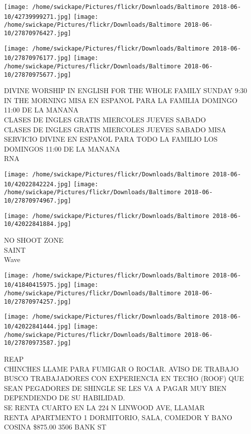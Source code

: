 \documentclass[10pt,letterpaper]{article}
\begin{document}
\texttt{[image: /home/swickape/Pictures/flickr/Downloads/Baltimore 2018-06-10/42739999271.jpg]}
\texttt{[image: /home/swickape/Pictures/flickr/Downloads/Baltimore 2018-06-10/27870976427.jpg]}

\texttt{[image: /home/swickape/Pictures/flickr/Downloads/Baltimore 2018-06-10/27870976177.jpg]}
\texttt{[image: /home/swickape/Pictures/flickr/Downloads/Baltimore 2018-06-10/27870975677.jpg]}

DIVINE WORSHIP IN ENGLISH FOR THE WHOLE FAMILY SUNDAY 9:30 IN THE MORNING MISA EN ESPANOL PARA LA FAMILIA DOMINGO 11:00 DE LA MANANA\\
CLASES DE INGLES GRATIS MIERCOLES JUEVES SABADO\\
CLASES DE INGLES GRATIS MIERCOLES JUEVES SABADO MISA SERVICIO DIVINE EN ESPANOL PARA TODO LA FAMILIO LOS DOMINGOS 11:00 DE LA MANANA\\
RNA\\
\pagebreak

\texttt{[image: /home/swickape/Pictures/flickr/Downloads/Baltimore 2018-06-10/42022842224.jpg]}
\texttt{[image: /home/swickape/Pictures/flickr/Downloads/Baltimore 2018-06-10/27870974967.jpg]}

\vspace{0.25in}
\texttt{[image: /home/swickape/Pictures/flickr/Downloads/Baltimore 2018-06-10/42022841884.jpg]}

NO SHOOT ZONE\\
SAINT\\
Wave\\
\pagebreak

\texttt{[image: /home/swickape/Pictures/flickr/Downloads/Baltimore 2018-06-10/41840415975.jpg]}
\texttt{[image: /home/swickape/Pictures/flickr/Downloads/Baltimore 2018-06-10/27870974257.jpg]}

\texttt{[image: /home/swickape/Pictures/flickr/Downloads/Baltimore 2018-06-10/42022841444.jpg]}
\texttt{[image: /home/swickape/Pictures/flickr/Downloads/Baltimore 2018-06-10/27870973587.jpg]}

REAP\\
CHINCHES LLAME PARA FUMIGAR O ROCIAR. AVISO DE TRABAJO BUSCO TRABAJADORES CON EXPERIENCIA EN TECHO (ROOF) QUE SEAN PEGADORES DE SHINGLE SE LES VA A PAGAR MUY BIEN DEPENDIENDO DE SU HABILIDAD.\\
SE RENTA CUARTO EN LA 224 N LINWOOD AVE, LLAMAR\\
RENTA APARTMENTO 1 DORMITORIO, SALA, COMEDOR Y BANO COSINA \$875.00 3506 BANK ST\\
\pagebreak
\end{document}
